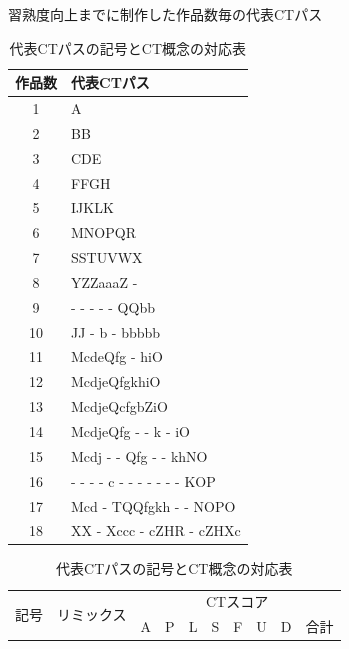 \documentclass[submit,ses,noauthor]{ipsj}
\begin{document}
\begin{table}[h]
  \begin{minipage}[t]{0.45\linewidth} %
    \centering
    \caption{習熟度向上までに制作した作品数毎の代表CTパス}
    \label{tab:split-ct-dtom}
    \vspace{2mm}
  \begin{tabular}{c|l}
    \hline
    作品数 & 代表CTパス\\
    \hline
    \hline
    1 & A \\
    \hline
    2 & BB \\
    \hline
    3 & CDE \\
    \hline
    4 & FFGH \\
    \hline
    5 & IJKLK \\
    \hline
    6 & MNOPQR \\
    \hline
    7 & SSTUVWX  \\
    \hline
    8 & YZZaaaZ - \\
    \hline
    9 & - - - - - QQbb \\
    \hline
    10 & JJ - b - bbbbb \\
    \hline
    11 & McdeQfg - hiO \\
    \hline
    12 & McdjeQfgkhiO \\
    \hline
    13 & McdjeQcfgbZiO \\
    \hline
    14 & McdjeQfg - - k - iO \\
    \hline
    15 & Mcdj - - Qfg - - khNO \\
    \hline
    16 & - - - - c - - - - - - - KOP \\
    \hline
    17 & Mcd - TQQfgkh - - NOPO \\
    \hline
    18 & XX - Xccc - cZHR - cZHXc  \\
    \hline
  \end{tabular}
  \end{minipage}%
  \begin{minipage}[t]{0.55\linewidth}
    \centering
    \caption{代表CTパスの記号とCT概念の対応表}
    \label{tab:dict-dtom}
    \vspace{8mm}
      \begin{tabular}{c|c|cccccccc}
\hline
\multirow{2}{*}{記号} & \multicolumn{1}{l|}{\multirow{2}{*}{\small{リミックス}}} & \multicolumn{8}{c}{CTスコア}                                                                                                                                                         \\ \cline{3-10} 
                    & \multicolumn{1}{l|}{}                       & \multicolumn{1}{c|}{A} & \multicolumn{1}{c|}{P} & \multicolumn{1}{c|}{L} & \multicolumn{1}{c|}{S} & \multicolumn{1}{c|}{F} & \multicolumn{1}{c|}{U} & \multicolumn{1}{c|}{D} & 合計 \\ \hline \hline

\end{tabular}
\end{minipage}
\end{table}
\end{document}
